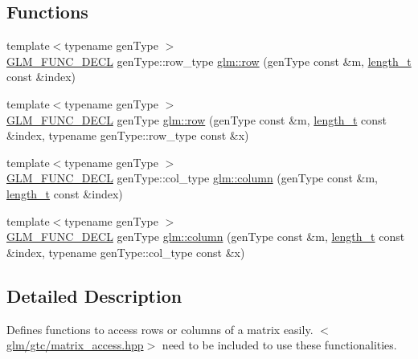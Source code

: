 \subsection*{Functions}
\begin{DoxyCompactItemize}
\item 
{\footnotesize template$<$typename gen\+Type $>$ }\\\hyperlink{setup_8hpp_ab2d052de21a70539923e9bcbf6e83a51}{G\+L\+M\+\_\+\+F\+U\+N\+C\+\_\+\+D\+E\+CL} gen\+Type\+::row\+\_\+type \hyperlink{group__gtc__matrix__access_ga5b874831eef18913dbe30153e52a2476}{glm\+::row} (gen\+Type const \&m, \hyperlink{namespaceglm_a090a0de2260835bee80e71a702492ed9}{length\+\_\+t} const \&index)
\item 
{\footnotesize template$<$typename gen\+Type $>$ }\\\hyperlink{setup_8hpp_ab2d052de21a70539923e9bcbf6e83a51}{G\+L\+M\+\_\+\+F\+U\+N\+C\+\_\+\+D\+E\+CL} gen\+Type \hyperlink{group__gtc__matrix__access_gacb34e8dca9cd0efdd247a65e36ed0a86}{glm\+::row} (gen\+Type const \&m, \hyperlink{namespaceglm_a090a0de2260835bee80e71a702492ed9}{length\+\_\+t} const \&index, typename gen\+Type\+::row\+\_\+type const \&x)
\item 
{\footnotesize template$<$typename gen\+Type $>$ }\\\hyperlink{setup_8hpp_ab2d052de21a70539923e9bcbf6e83a51}{G\+L\+M\+\_\+\+F\+U\+N\+C\+\_\+\+D\+E\+CL} gen\+Type\+::col\+\_\+type \hyperlink{group__gtc__matrix__access_ga5c37fbeb062151f930e8a231c37e6b81}{glm\+::column} (gen\+Type const \&m, \hyperlink{namespaceglm_a090a0de2260835bee80e71a702492ed9}{length\+\_\+t} const \&index)
\item 
{\footnotesize template$<$typename gen\+Type $>$ }\\\hyperlink{setup_8hpp_ab2d052de21a70539923e9bcbf6e83a51}{G\+L\+M\+\_\+\+F\+U\+N\+C\+\_\+\+D\+E\+CL} gen\+Type \hyperlink{group__gtc__matrix__access_gaff0c6f887deb04ce0519084d32aadb85}{glm\+::column} (gen\+Type const \&m, \hyperlink{namespaceglm_a090a0de2260835bee80e71a702492ed9}{length\+\_\+t} const \&index, typename gen\+Type\+::col\+\_\+type const \&x)
\end{DoxyCompactItemize}


\subsection{Detailed Description}
Defines functions to access rows or columns of a matrix easily. $<$\hyperlink{matrix__access_8hpp}{glm/gtc/matrix\+\_\+access.\+hpp}$>$ need to be included to use these functionalities. 

